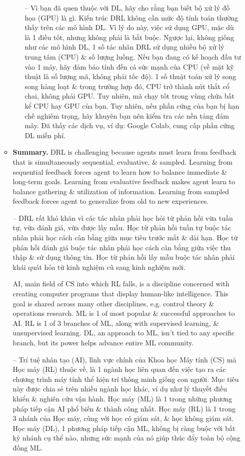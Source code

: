 \documentclass{article}
\begin{document}
\begin{itemize}
\begin{itemize}
\begin{itemize}
            -- Vì bạn đã quen thuộc với DL, hãy cho rằng bạn biết bộ xử lý đồ họa (GPU) là gì. Kiến trúc DRL không cần mức độ tính toán thường thấy trên các mô hình DL. Vì lý do này, việc sử dụng GPU, mặc dù là 1 điều tốt, nhưng không phải là bắt buộc. Ngược lại, không giống như các mô hình DL, 1 số tác nhân DRL sử dụng nhiều bộ xử lý trung tâm (CPU) \& số lượng luồng. Nếu bạn đang có kế hoạch đầu tư vào 1 máy, hãy đảm bảo tính đến cả sức mạnh của CPU (về mặt kỹ thuật là số lượng mã, không phải tốc độ). 1 số thuật toán xử lý song song hàng loạt \& trong trường hợp đó, CPU trở thành nút thắt cổ chai, không phải GPU. Tuy nhiên, mã chạy tốt trong vùng chứa bất kể CPU hay GPU của bạn. Tuy nhiên, nếu phần cứng của bạn bị hạn chế nghiêm trọng, hãy khuyên bạn nên kiểm tra các nền tảng đám mây. Đã thấy các dịch vụ, ví dụ: Google Colab, cung cấp phần cứng DL miễn phí.
        \end{itemize}
        \item {\bf Summary.} DRL is challenging because agents must learn from feedback that is simultaneously sequential, evaluative, \& sampled. Learning from sequential feedback forces agent to learn how to balance immediate \& long-term goals. Learning from evaluative feedback makes agent learn to balance gathering \& utilization of information. Learning from sampled feedback forces agent to generalize from old to new experiences.

        -- DRL rất khó khăn vì các tác nhân phải học hỏi từ phản hồi vừa tuần tự, vừa đánh giá, vừa được lấy mẫu. Học từ phản hồi tuần tự buộc tác nhân phải học cách cân bằng giữa mục tiêu trước mắt \& dài hạn. Học từ phản hồi đánh giá buộc tác nhân phải học cách cân bằng giữa việc thu thập \& sử dụng thông tin. Học từ phản hồi lấy mẫu buộc tác nhân phải khái quát hóa từ kinh nghiệm cũ sang kinh nghiệm mới.

        AI, main field of CS into which RL falls, is a discipline concerned with creating computer programs that display human-like intelligence. This goal is shared across many other disciplines, e.g. control theory \& operations research. ML is 1 of most popular \& successful approaches to AI. RL is 1 of 3 branches of ML, along with supervised learning, \& unsupervised learning. DL, an approach to ML, isn't tied to any specific branch, but its power helps advance entire ML community.

        -- Trí tuệ nhân tạo (AI), lĩnh vực chính của Khoa học Máy tính (CS) mà Học máy (RL) thuộc về, là 1 ngành học liên quan đến việc tạo ra các chương trình máy tính thể hiện trí thông minh giống con người. Mục tiêu này được chia sẻ trên nhiều ngành học khác, ví dụ như lý thuyết điều khiển \& nghiên cứu vận hành. Học máy (ML) là 1 trong những phương pháp tiếp cận AI phổ biến \& thành công nhất. Học máy (RL) là 1 trong 3 nhánh của Học máy, cùng với học có giám sát, \& học không giám sát. Học máy (DL), 1 phương pháp tiếp cận ML, không bị ràng buộc với bất kỳ nhánh cụ thể nào, nhưng sức mạnh của nó giúp thúc đẩy toàn bộ cộng đồng ML.


\end{itemize}
\end{itemize}
\end{document}
